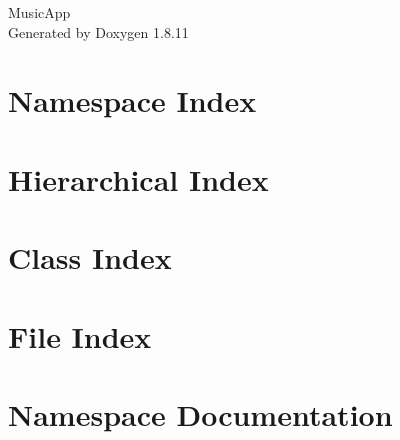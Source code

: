 \documentclass[twoside]{book}
\newcommand{\+}{\discretionary{\mbox{\scriptsize$\hookleftarrow$}}{}{}}
\newcommand{\clearemptydoublepage}{%
  \newpage{\pagestyle{empty}\cleardoublepage}%
}
\begin{document}
\hypersetup{pageanchor=false,
             bookmarksnumbered=true,
             pdfencoding=unicode
            }
\begin{titlepage}
\vspace*{7cm}
\begin{center}%
{\Large Music\+App }\\
\vspace*{1cm}
{\large Generated by Doxygen 1.8.11}\\
\end{center}
\end{titlepage}
\clearemptydoublepage
\tableofcontents
\clearemptydoublepage
{}
\hypersetup{pageanchor=true}

\chapter{Namespace Index}

\chapter{Hierarchical Index}

\chapter{Class Index}

\chapter{File Index}

\chapter{Namespace Documentation}











\end{document}
